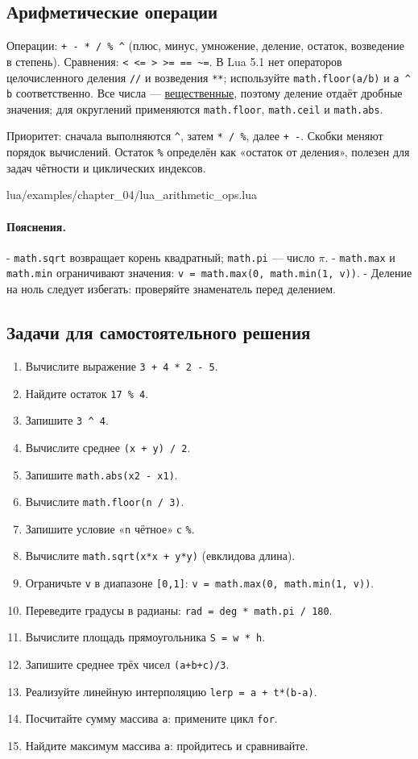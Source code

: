 \subsection{Арифметические операции}
Операции: \verb|+ - * / % ^| (плюс, минус, умножение, деление, остаток, возведение в степень). Сравнения: \verb|< <= > >= == ~=|. В Lua 5.1 нет операторов целочисленного деления \verb|//| и возведения \verb|**|; используйте \verb|math.floor(a/b)| и \verb|a ^ b| соответственно. Все числа — \hyperlink{term:number}{вещественные}, поэтому деление отдаёт дробные значения; для округлений применяются \verb|math.floor|, \verb|math.ceil| и \verb|math.abs|.

Приоритет: сначала выполняются \verb|^|, затем \verb|* / %|, далее \verb|+ -|. Скобки меняют порядок вычислений. Остаток \verb|%| определён как «остаток от деления», полезен для задач чётности и циклических индексов.
\begin{codefile}{lua/examples/chapter_04/lua_arithmetic_ops.lua}
\end{codefile}
\paragraph{Пояснения.}
- \verb|math.sqrt| возвращает корень квадратный; \verb|math.pi| — число $\pi$.
- \verb|math.max| и \verb|math.min| ограничивают значения: \verb|v = math.max(0, math.min(1, v))|.
- Деление на ноль следует избегать: проверяйте знаменатель перед делением.
\subsection*{Задачи для самостоятельного решения}
\begin{enumerate}
  \item Вычислите выражение \verb|3 + 4 * 2 - 5|.
  \item Найдите остаток \verb|17 % 4|.
  \item Запишите \verb|3 ^ 4|.
  \item Вычислите среднее \verb|(x + y) / 2|.
  \item Запишите \verb|math.abs(x2 - x1)|.
  \item Вычислите \verb|math.floor(n / 3)|.
  \item Запишите условие «\verb|n| чётное» с \verb|%|.
  \item Вычислите \verb|math.sqrt(x*x + y*y)| (евклидова длина).
  \item Ограничьте \verb|v| в диапазоне \verb|[0,1]|: \verb|v = math.max(0, math.min(1, v))|.
  \item Переведите градусы в радианы: \verb|rad = deg * math.pi / 180|.
  \item Вычислите площадь прямоугольника \verb|S = w * h|.
  \item Запишите среднее трёх чисел \verb|(a+b+c)/3|.
  \item Реализуйте линейную интерполяцию \verb|lerp = a + t*(b-a)|.
  \item Посчитайте сумму массива \verb|a|: примените цикл \verb|for|.
  \item Найдите максимум массива \verb|a|: пройдитесь и сравнивайте.
\end{enumerate}

